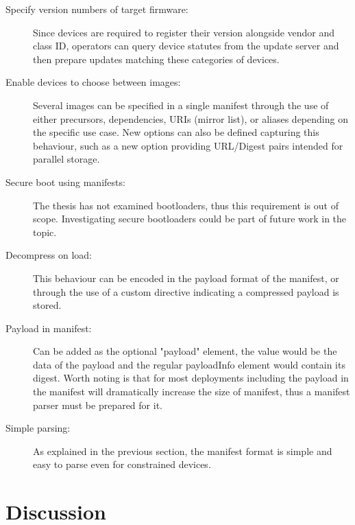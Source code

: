 \documentclass[0-thesis.tex]{subfiles}
\begin{document}
\begin{description}
    \item[Specify version numbers of target firmware:]
        Since devices are required to register their version alongside vendor and class
        ID, operators can query device statutes from the update server and then prepare
        updates matching these categories of devices.

    \item[Enable devices to choose between images:]
        Several images can be specified in a single manifest through the use of either
        precursors, dependencies, URIs (mirror list), or aliases depending on the specific
        use case. New options can also be defined capturing this behaviour, such as a new
        option providing URL/Digest pairs intended for parallel storage.

    \item[Secure boot using manifests:]
        The thesis has not examined bootloaders, thus this requirement is out of scope.
        Investigating secure bootloaders could be part of future work in the topic.

    \item[Decompress on load:]
        This behaviour can be encoded in the payload format of the manifest, or through
        the use of a custom directive indicating a compressed payload is stored.

    \item[Payload in manifest:]
        Can be added as the optional "payload" element, the value would be the data of the
        payload and the regular payloadInfo element would contain its digest. Worth noting
        is that for most deployments including the payload in the manifest will
        dramatically increase the size of manifest, thus a manifest parser must be
        prepared for it.

    \item[Simple parsing:]
        As explained in the previous section, the manifest format is simple and easy to
        parse even for constrained devices.
\end{description}

\section{Discussion}
\label{sec:discussion}
\end{document}
